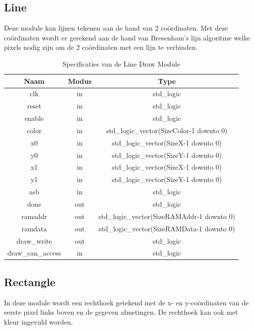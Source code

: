 \documentclass{scrartcl} %
\begin{document}
\subsection {Line}
Deze module kan lijnen tekenen aan de hand van 2 coördinaten. Met deze coördinaten wordt er gerekend aan de hand van Bresenham's lijn algoritme welke pixels nodig zijn om de 2 coördinaten met een lijn te verbinden.

\begin{table}[H]
\centering
\caption{Specificaties van de Line Draw Module}
\label{tab:spec-line-draw}
\begin{tabular}{c c c}
	\hline\hline
 	Naam & Modus & Type\\
 	\hline	
	clk & in & std\_logic \\
	reset & in & std\_logic \\
	enable& in & std\_logic \\
	color & in & std\_logic\_vector(SizeColor-1 downto 0) \\
	x0 & in & std\_logic\_vector(SizeX-1 downto 0) \\
	y0 & in & std\_logic\_vector(SizeY-1 downto 0) \\
	x1 & in & std\_logic\_vector(SizeX-1 downto 0) \\
	y1 & in & std\_logic\_vector(SizeY-1 downto 0) \\
	asb & in & std\_logic \\
	done & out & std\_logic \\
	ramaddr &out & std\_logic\_vector(SizeRAMAddr-1 downto 0) \\
	ramdata &out & std\_logic\_vector(SizeRAMData-1 downto 0) \\
	draw\_write &out & std\_logic \\
	draw\_can\_access & in & std\_logic \\
  	\hline
\end{tabular}
\end{table}

\subsection {Rectangle}
In deze module wordt een rechthoek getekend met de x- en y-coördinaten van de eerste pixel links boven en de gegeven afmetingen. De rechthoek kan ook met kleur ingevuld worden. 
\end{document}
